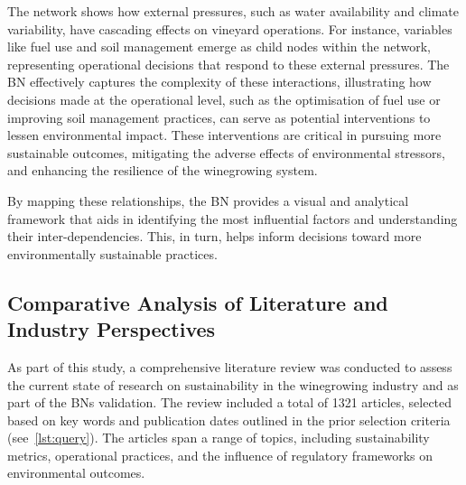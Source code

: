 \documentclass[fleqn,10pt]{wlscirep}
\begin{document}
The network shows how external pressures, such as water availability and climate variability, have cascading effects on vineyard operations. For instance, variables like fuel use and soil management emerge as child nodes within the network, representing operational decisions that respond to these external pressures. The BN effectively captures the complexity of these interactions, illustrating how decisions made at the operational level, such as the optimisation of fuel use or improving soil management practices, can serve as potential interventions to lessen environmental impact. These interventions are critical in pursuing more sustainable outcomes, mitigating the adverse effects of environmental stressors, and enhancing the resilience of the winegrowing system.

By mapping these relationships, the BN provides a visual and analytical framework that aids in identifying the most influential factors and understanding their inter-dependencies. This, in turn, helps inform decisions toward more environmentally sustainable practices.

\subsection*{Comparative Analysis of Literature and Industry Perspectives}

As part of this study, a comprehensive literature review was conducted to assess the current state of research on sustainability in the winegrowing industry and as part of the BNs validation. The review included a total of 1321 articles, selected based on key words and publication dates outlined in the prior selection criteria (see~\ref{lst:query}). The articles span a range of topics, including sustainability metrics, operational practices, and the influence of regulatory frameworks on environmental outcomes.
\end{document}
